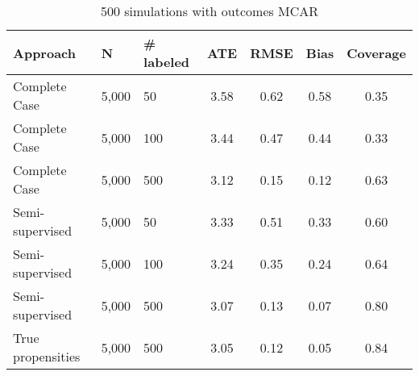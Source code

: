 \begin{table}[ht]
\centering
\begingroup\small
\begin{tabular}{lllcccc}
  \hline
Approach & N & \# labeled & ATE & RMSE & Bias & Coverage \\ 
  \hline
  Complete Case & 5,000 &  50 & 3.58 & 0.62 & 0.58 & 0.35 \\ 
  Complete Case & 5,000 & 100 & 3.44 & 0.47 & 0.44 & 0.33 \\ 
  Complete Case & 5,000 & 500 & 3.12 & 0.15 & 0.12 & 0.63 \\ 
  Semi-supervised & 5,000 &  50 & 3.33 & 0.51 & 0.33 & 0.60 \\ 
  Semi-supervised & 5,000 & 100 & 3.24 & 0.35 & 0.24 & 0.64 \\ 
  Semi-supervised & 5,000 & 500 & 3.07 & 0.13 & 0.07 & 0.80 \\ 
  True propensities & 5,000 & 500 & 3.05 & 0.12 & 0.05 & 0.84 \\ 
   \hline
\end{tabular}
\endgroup
\caption{500 simulations with outcomes MCAR} 
\end{table}

